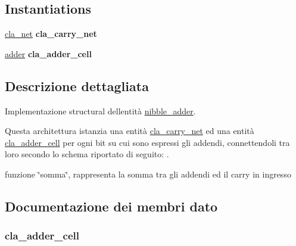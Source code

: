 \subsection*{Instantiations}
 \begin{DoxyCompactItemize}
\item 
\hyperlink{classnibble__adder_1_1structural_abbf8fdf15c2d70392ab929c8ebe57439}{cla\+\_\+net}  {\bfseries cla\+\_\+carry\+\_\+net}   
\item 
\hyperlink{classnibble__adder_1_1structural_a9d7a8a381439c61aea549e7a47ec7a6f}{adder}  {\bfseries cla\+\_\+adder\+\_\+cell}   
\end{DoxyCompactItemize}


\subsection{Descrizione dettagliata}
Implementazione structural dell\textquotesingle{}entità \hyperlink{classnibble__adder}{nibble\+\_\+adder}.

Questa architettura istanzia una entità \hyperlink{classcla__carry__net}{cla\+\_\+carry\+\_\+net} ed una entità \hyperlink{classcla__adder__cell}{cla\+\_\+adder\+\_\+cell} per ogni bit su cui sono espressi gli addendi, connettendoli tra loro secondo lo schema riportato di seguito\+: . 

funzione \char`\"{}somma\char`\"{}, rappresenta la somma tra gli addendi ed il carry in ingresso 

\subsection{Documentazione dei membri dato}
\subsubsection[{\texorpdfstring{adder}{adder}}]{ {\bfseries \textcolor{vhdlchar}{cla\+\_\+adder\+\_\+cell}\textcolor{vhdlchar}{ }} \hspace{0.3cm}{\ttfamily [Instantiation]}}\hypertarget{classnibble__adder_1_1structural_a9d7a8a381439c61aea549e7a47ec7a6f}{}\label{classnibble__adder_1_1structural_a9d7a8a381439c61aea549e7a47ec7a6f}
